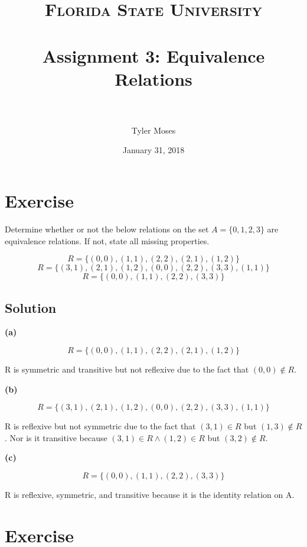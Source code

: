 \documentclass[paper=a4, fontsize=11pt]{scrartcl} %
\title{	
\normalfont \normalsize 
\textsc{Florida State University} \\ [25pt] %
\horrule{0.5pt} \\[0.4cm] %
\huge Assignment 3: Equivalence Relations \\ %
\horrule{2pt} \\[0.5cm] %
}
\author{Tyler Moses} %
\date{\normalsize January 31, 2018} %
\numberwithin{equation}{section} %
\numberwithin{figure}{section} %
\numberwithin{table}{section} %
\begin{document}
\maketitle %


\section{Exercise}

Determine whether or not the below relations on the set $A = \{0,1,2,3\}$ are equivalence relations. If not, state all missing properties.

$$R = \{(0,0),(1,1),(2,2),(2,1),(1,2)\}$$
$$R = \{(3,1),(2,1),(1,2),(0,0),(2,2),(3,3),(1,1)\}$$
$$R = \{(0,0),(1,1),(2,2),(3,3)\}$$

\subsection{Solution}

\textbf{(a)}

$$R = \{(0,0),(1,1),(2,2),(2,1),(1,2)\}$$

R is symmetric and transitive but not reflexive due to the fact that $(0,0) \not\in R$.

\textbf{(b)}

$$R = \{(3,1),(2,1),(1,2),(0,0),(2,2),(3,3),(1,1)\}$$

R is reflexive but not symmetric due to the fact that $(3,1) \in R$ but $(1,3) \not\in R$. Nor is it transitive because 
$(3,1) \in R \land (1,2) \in R$ but $(3,2) \not\in R$.

\textbf{(c)}

$$R = \{(0,0),(1,1),(2,2),(3,3)\}$$

R is reflexive, symmetric, and transitive because it is the identity relation on A.


\section{Exercise}
\end{document}
